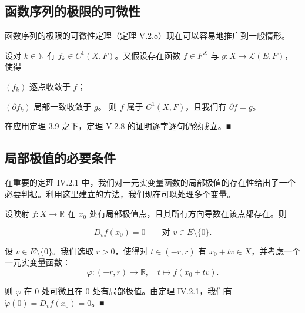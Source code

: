 \subsection*{函数序列的极限的可微性}

函数序列的极限的可微性定理（定理 V.2.8）现在可以容易地推广到一般情形。

\begin{theorem}

设对 $ k \in \mathbb{N} $ 有 $ f_k \in C^1(X, F) $。又假设存在函数 $ f \in F^X $ 与 $ g : X \to \mathcal{L}(E, F) $，使得

\begin{subitems}
\item

$ (f_k) $ 逐点收敛于 $ f $；

\item

$ (\partial f_k) $ 局部一致收敛于 $ g $。
则 $ f $ 属于 $ C^1(X, F) $，且我们有 $ \partial f = g $。

\proofhead
在应用定理 3.9 之下，定理 V.2.8 的证明逐字逐句仍然成立。\nobreak\hspace{0.35em}■
\end{subitems}

\end{theorem}

\subsection*{局部极值的必要条件}

在重要的定理 IV.2.1 中，我们对一元实变量函数的局部极值的存在性给出了一个必要判据。利用这里建立的方法，我们现在可以处理多个变量。

\begin{theorem}

设映射 $ f : X \to \mathbb{R} $ 在 $ x_0 $ 处有局部极值点，且其所有方向导数在该点都存在。则

\[
D_vf(x_0) = 0 \qquad \text{对 } v \in E\setminus\{0\} .
\]

\proofhead
设 $ v \in E\setminus\{0\} $。我们选取 $ r > 0 $，使得对 $ t \in (-r, r) $ 有 $ x_0 + tv \in X $，并考虑一个一元实变量函数：
\[
\varphi : (-r, r) \to \mathbb{R} , \quad t \mapsto f(x_0 + tv) .
\]

则 $ \varphi $ 在 $ 0 $ 处可微且在 $ 0 $ 处有局部极值。由定理 IV.2.1，我们有 $ \dot\varphi(0) = D_vf(x_0) = 0 $。\nobreak\hspace{0.35em}■

\end{theorem}

